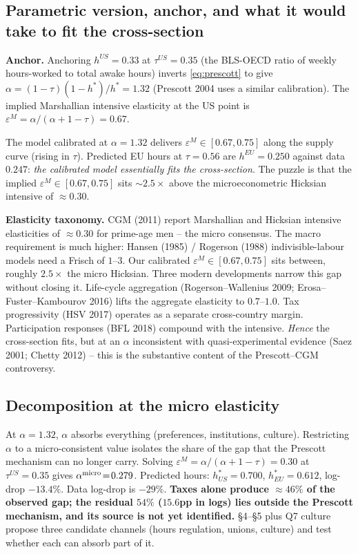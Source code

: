 \documentclass[9pt,a4paper]{extarticle}
\begin{document}
\subsection{Parametric version, anchor, and what it would take to fit
the cross-section}
\textbf{Anchor.} Anchoring $h^{US}\!=\!0.33$ at $\tau^{US}\!=\!0.35$
(the BLS-OECD ratio of weekly hours-worked to total awake hours)
inverts \eqref{eq:prescott} to give
$\alpha=(1-\tau)(1-h^\ast)/h^\ast=1.32$ (Prescott 2004 uses a similar
calibration). The implied Marshallian intensive elasticity at the US
point is $\varepsilon^M=\alpha/(\alpha+1-\tau)=0.67$.

The model calibrated at $\alpha\!=\!1.32$ delivers
$\varepsilon^M\!\in\![0.67,0.75]$ along the supply curve (rising in
$\tau$). Predicted EU hours at $\tau\!=\!0.56$ are
$h^{EU}\!=\!0.250$ against data $0.247$: \emph{the calibrated model
essentially fits the cross-section}. The puzzle is that the
implied $\varepsilon^M\!\in\![0.67,0.75]$ sits $\sim\!2.5\times$
above the microeconometric Hicksian intensive of $\approx\!0.30$.

\textbf{Elasticity taxonomy.} CGM (2011) report Marshallian and
Hicksian intensive elasticities of $\approx\!0.30$ for prime-age men
-- the micro consensus. The macro requirement is much higher:
Hansen (1985) / Rogerson (1988) indivisible-labour models need a
Frisch of $1$--$3$. Our calibrated
$\varepsilon^M\!\in\![0.67, 0.75]$ sits between, roughly $2.5\times$
the micro Hicksian. Three modern developments narrow this gap
without closing it. Life-cycle aggregation (Rogerson--Wallenius 2009;
Erosa--Fuster--Kambourov 2016) lifts the aggregate elasticity to
$0.7$--$1.0$. Tax progressivity (HSV 2017) operates as a separate
cross-country margin. Participation responses (BFL 2018) compound
with the intensive. \emph{Hence} the cross-section fits, but at an
$\alpha$ inconsistent with quasi-experimental evidence (Saez 2001;
Chetty 2012) -- this is the substantive content of the Prescott--CGM
controversy.

\subsection{Decomposition at the micro elasticity}
At $\alpha\!=\!1.32$, $\alpha$ absorbs everything (preferences,
institutions, culture). Restricting $\alpha$ to a micro-consistent
value isolates the share of the gap that the Prescott mechanism can
no longer carry. Solving
$\varepsilon^M\!=\!\alpha/(\alpha+1-\tau)\!=\!0.30$ at
$\tau^{US}\!=\!0.35$ gives $\alpha^{\rm micro}\!=\!0.279$. Predicted
hours: $h^*_{US}\!=\!0.700$, $h^*_{EU}\!=\!0.612$, log-drop
$-13.4\%$. Data log-drop is $-29\%$. \textbf{Taxes alone produce
$\approx 46\%$ of the observed gap; the residual $54\%$ ($15.6$pp
in logs) lies outside the Prescott mechanism, and its source is
not yet identified.} \S 4--\S 5 plus Q7 culture propose three candidate channels
(hours regulation, unions, culture) and test whether each can
absorb part of it.
\end{document}
